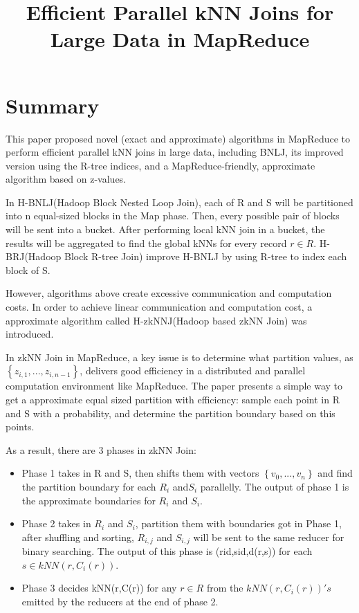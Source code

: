 \documentclass[conference]{IEEEtran}
\begin{document}
	\title{Efficient Parallel kNN Joins for Large Data in MapReduce}	
	\maketitle
	\IEEEpeerreviewmaketitle	
	\section{Summary}
	This paper proposed novel (exact and approximate) algorithms in MapReduce to perform efficient parallel kNN joins in large data, including BNLJ, its improved version using the R-tree indices, and a MapReduce-friendly, approximate algorithm based on z-values.

	In H-BNLJ(Hadoop Block Nested Loop Join), each of R and S will be partitioned into n equal-sized blocks in the Map phase. Then, every possible pair of blocks will be sent into a bucket. After performing local kNN join in a bucket, the results will be aggregated to find the global kNNs for every record $r\in R$. H-BRJ(Hadoop Block R-tree Join) improve H-BNLJ by using R-tree to index each block of S.
	
	However, algorithms above create excessive communication and computation costs. In order to achieve linear communication and computation cost, a approximate algorithm called H-zkNNJ(Hadoop based zkNN Join) was introduced.
	
	In zkNN Join in MapReduce, a key issue is to determine what partition values, as $\left\lbrace z_{i,1},...,z_{i,n-1} \right\rbrace$, delivers good efficiency in a distributed and parallel computation environment like MapReduce. The paper presents a simple way to get a approximate equal sized partition with efficiency: sample each point in R and S with a probability, and determine the partition boundary based on this points. 
	
	As a result, there are 3 phases in zkNN Join: 
	\begin{itemize}
		\item Phase 1 takes in R and S, then shifts them with vectors $\left\lbrace v_0,...,v_n \right\rbrace$ and find the partition boundary for each $R_i$ and$ S_i$ parallelly. The output of phase 1 is the approximate boundaries for $R_i$ and $S_i$.
		\item Phase 2 takes in $R_i$ and $S_i$, partition them with boundaries got in Phase 1, after shuffling and sorting, $R_{i,j}$ and $S_{i,j}$ will be sent to the same reducer for binary searching. The output of this phase is (rid,sid,d(r,s)) for each $s\in kNN(r,C_i(r))$.
		\item Phase 3 decides kNN(r,C(r)) for any $r\in R$ from the $kNN(r,C_i(r))'s$ emitted by the reducers at the end of phase 2.
	\end{itemize}
\end{document}
